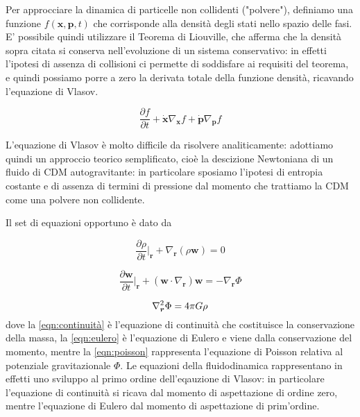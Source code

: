 Per approcciare la dinamica di particelle non collidenti ("polvere"), definiamo una funzione $f(\bm{x}, \bm{p}, t)$ 
che corrisponde alla densità degli stati nello spazio delle fasi. E' possibile quindi utilizzare il Teorema di 
Liouville, che afferma che la densità sopra citata si conserva nell'evoluzione di un sistema conservativo: in 
effetti l'ipotesi di assenza di collisioni ci permette di soddisfare ai requisiti del teorema, e quindi 
possiamo porre a zero la derivata totale della funzione densità, ricavando l'equazione di Vlasov.

\begin{equation}
    \label{eqn:vlasov}
    \frac{\partial f}{\partial t} + \dot{\bm{x}} \nabla_{\bm{x}}f + \dot{\bm{p}} \nabla_{\bm{p}}f 
\end{equation}

L'equazione di Vlasov è molto difficile da risolvere analiticamente: adottiamo quindi un approccio 
teorico semplificato, cioè la descizione Newtoniana di un fluido di CDM autogravitante: in particolare
sposiamo l'ipotesi di entropia costante e di assenza di termini di pressione dal momento che trattiamo 
la CDM come una polvere non collidente. 

Il set di equazioni opportuno è dato da

\begin{equation}
    \label{eqn:continuità}
    \frac{\partial\rho}{\partial t}\biggr|_{\bm{r}} + \nabla_{\bm{r}}(\rho \bm{w}) = 0
\end{equation}

\begin{equation}
    \label{eqn:eulero}
    \frac{\partial\bm{w}}{\partial t}\biggr|_{\bm{r}} + (\bm{w}\cdot\nabla_{\bm{r}})\bm{w} = - \nabla_{\bm{r}} \Phi
\end{equation}

\begin{equation}
    \label{eqn:poisson}
    \laplacian_{\bm{r}}\Phi = 4\pi G \rho
\end{equation}
dove la \ref{eqn:continuità} è l'equazione di continuità che costituisce la conservazione
della massa, la \ref{eqn:eulero} è l'equazione di Eulero e viene dalla conservazione del
momento, mentre la \ref{eqn:poisson} rappresenta l'equazione di Poisson relativa
al potenziale gravitazionale $\Phi$.
Le equazioni della fluidodinamica rappresentano in effetti uno sviluppo al primo ordine 
dell'eqauzione di Vlasov: in particolare l'equazione di continuità si ricava dal momento
di aspettazione di ordine zero, mentre l'equazione di Eulero dal momento di aspettazione
di prim'ordine.

